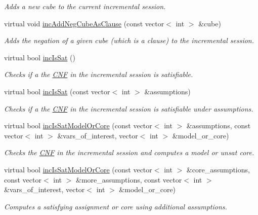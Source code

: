 \begin{DoxyCompactItemize}
\begin{DoxyCompactList}\small\item\em Adds a new cube to the current incremental session. \end{DoxyCompactList}\item 
virtual void \hyperlink{classPicoSatApi_ace9bfbd0c8cbd62c3e92d2b208bb7b66}{inc\-Add\-Neg\-Cube\-As\-Clause} (const vector$<$ int $>$ \&cube)
\begin{DoxyCompactList}\small\item\em Adds the negation of a given cube (which is a clause) to the incremental session. \end{DoxyCompactList}\item 
virtual bool \hyperlink{classPicoSatApi_a0d1237c039315d572fb0828c59435177}{inc\-Is\-Sat} ()
\begin{DoxyCompactList}\small\item\em Checks if a the \hyperlink{classCNF}{C\-N\-F} in the incremental session is satisfiable. \end{DoxyCompactList}\item 
virtual bool \hyperlink{classPicoSatApi_abebe28c72303235d2fdc915bbf4752c0}{inc\-Is\-Sat} (const vector$<$ int $>$ \&assumptions)
\begin{DoxyCompactList}\small\item\em Checks if a the \hyperlink{classCNF}{C\-N\-F} in the incremental session is satisfiable under assumptions. \end{DoxyCompactList}\item 
virtual bool \hyperlink{classPicoSatApi_aa8c0dbf4587ff4666ce20fd325364c4a}{inc\-Is\-Sat\-Model\-Or\-Core} (const vector$<$ int $>$ \&assumptions, const vector$<$ int $>$ \&vars\-\_\-of\-\_\-interest, vector$<$ int $>$ \&model\-\_\-or\-\_\-core)
\begin{DoxyCompactList}\small\item\em Checks the \hyperlink{classCNF}{C\-N\-F} in the incremental session and computes a model or unsat core. \end{DoxyCompactList}\item 
virtual bool \hyperlink{classPicoSatApi_ada5b2d2ba3cf20b0ab007a62cc73028a}{inc\-Is\-Sat\-Model\-Or\-Core} (const vector$<$ int $>$ \&core\-\_\-assumptions, const vector$<$ int $>$ \&more\-\_\-assumptions, const vector$<$ int $>$ \&vars\-\_\-of\-\_\-interest, vector$<$ int $>$ \&model\-\_\-or\-\_\-core)
\begin{DoxyCompactList}\small\item\em Computes a satisfying assignment or core using additional assumptions. \end{DoxyCompactList}\item 

\end{DoxyCompactItemize}
